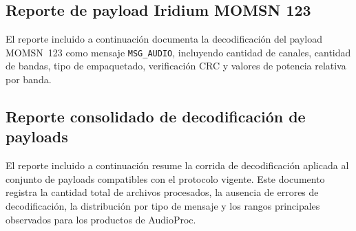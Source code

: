\clearpage

\subsection{Reporte de payload Iridium MOMSN 123}
\label{ap:reporte_sbd_momsn_123}

El reporte incluido a continuación documenta la decodificación del payload MOMSN~123 como mensaje \texttt{MSG\_AUDIO}, incluyendo cantidad de canales, cantidad de bandas, tipo de empaquetado, verificación CRC y valores de potencia relativa por banda.



\clearpage

\subsection{Reporte consolidado de decodificación de payloads}
\label{ap:reporte_payloads_iridium}

El reporte incluido a continuación resume la corrida de decodificación aplicada al conjunto de payloads compatibles con el protocolo vigente. Este documento registra la cantidad total de archivos procesados, la ausencia de errores de decodificación, la distribución por tipo de mensaje y los rangos principales observados para los productos de AudioProc.


